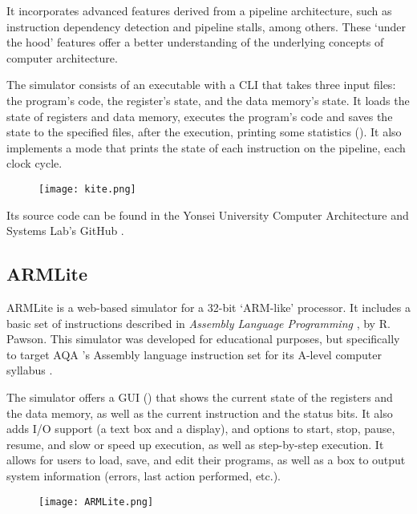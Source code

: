 It incorporates advanced features derived from a \gls{pipeline} architecture, such as \gls{instruction dependency} detection and \gls{pipeline stalls}, among others. These `under the hood' features offer a better understanding of the underlying concepts of computer architecture.

The simulator consists of an executable with a \gls{CLI} that takes three input files: the program's code, the register's state, and the data \gls{memory}'s state. It loads the state of registers and data \gls{memory}, executes the program's code and saves the state to the specified files, after the execution, printing some statistics (). It also implements a  mode that prints the state of each instruction on the \gls{pipeline}, each \gls{clock cycle}.

\begin{figure}[htb]
    {\texttt{[image: kite.png]}}
\end{figure}

Its source code can be found in the Yonsei University Computer Architecture and Systems Lab's GitHub \parencite{kiteGH}.


\subsection*{ARMLite}\label{subsubsec:armlite}
ARMLite \parencite{ARMLite} is a web-based simulator for a 32-bit `ARM-like' processor. It includes a basic set of instructions described in \textit{Assembly Language Programming} \parencite{PawsonRichard.2020Ass}, by R. Pawson. This simulator was developed for educational purposes, but specifically to target AQA \parencite{AQA}'s Assembly language instruction set for its A-level computer syllabus \parencite{AQAInstructionSet}.

The simulator offers a \gls{GUI} () that shows the current state of the \glspl{register} and the data \gls{memory}, as well as the current instruction and the status bits. It also adds \gls{I/O} support (a text box and a display), and options to start, stop, pause, resume, and slow or speed up execution, as well as step-by-step execution. It allows for users to load, save, and edit their programs, as well as a box to output system information (errors, last action performed, etc.).

\begin{figure}[htb]
    {\texttt{[image: ARMLite.png]}}
\end{figure}

